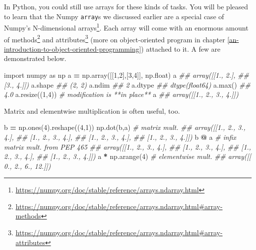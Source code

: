 \documentclass[
  12pt,
]{krantz}
\makeatletter
\newenvironment{Shaded}{\begin{snugshade}}{\end{snugshade}}
\newcommand{\BuiltInTok}[1]{#1}
\newcommand{\CommentTok}[1]{\textcolor[rgb]{0.37,0.37,0.37}{\textit{#1}}}
\newcommand{\DecValTok}[1]{\textcolor[rgb]{0.06,0.06,0.06}{#1}}
\newcommand{\ImportTok}[1]{#1}
\newcommand{\NormalTok}[1]{#1}
\newcommand{\OperatorTok}[1]{\textcolor[rgb]{0.43,0.43,0.43}{\textbf{#1}}}
\renewcommand{\href}[2]{#2\footnote{\url{#1}}}
\newenvironment{kframe}{%
\medskip{}
\setlength{\fboxsep}{.8em}
 \def\at@end@of@kframe{}%
 \ifinner\ifhmode%
  \def\at@end@of@kframe{\end{minipage}}%
  \begin{minipage}{\columnwidth}%
 \fi\fi%
 \def\FrameCommand##1{\hskip\@totalleftmargin \hskip-\fboxsep
 \colorbox{shadecolor}{##1}\hskip-\fboxsep
     \hskip-\linewidth \hskip-\@totalleftmargin \hskip\columnwidth}%
 \MakeFramed {\advance\hsize-\width
   \@totalleftmargin\z@ \linewidth\hsize
   \@setminipage}}%
 {\par\unskip\endMakeFramed%
 \at@end@of@kframe}
\renewenvironment{Shaded}{\begin{kframe}}{\end{kframe}}
\makeatother
\begin{document}
In Python, you could still use arrays for these kinds of tasks. You will be pleased to learn that the Numpy \texttt{array}s we discussed earlier are a special case of \href{https://numpy.org/doc/stable/reference/arrays.ndarray.html}{Numpy's N-dimensional arrays}. Each array will come with an enormous amount of \href{https://numpy.org/doc/stable/reference/arrays.ndarray.html\#array-methods}{methods} and \href{https://numpy.org/doc/stable/reference/arrays.ndarray.html\#array-attributes}{attributes} (more on object-oriented program in chapter \ref{an-introduction-to-object-oriented-programming}) attached to it. A few are demonstrated below.

\begin{Shaded}
\begin{Highlighting}[]
\ImportTok{import}\NormalTok{ numpy }\ImportTok{as}\NormalTok{ np}
\NormalTok{a }\OperatorTok{=}\NormalTok{ np.array([[}\DecValTok{1}\NormalTok{,}\DecValTok{2}\NormalTok{],[}\DecValTok{3}\NormalTok{,}\DecValTok{4}\NormalTok{]], np.}\BuiltInTok{float}\NormalTok{)}
\NormalTok{a}
\CommentTok{\#\# array([[1., 2.],}
\CommentTok{\#\#        [3., 4.]])}
\NormalTok{a.shape}
\CommentTok{\#\# (2, 2)}
\NormalTok{a.ndim}
\CommentTok{\#\# 2}
\NormalTok{a.dtype}
\CommentTok{\#\# dtype(\textquotesingle{}float64\textquotesingle{})}
\NormalTok{a.}\BuiltInTok{max}\NormalTok{()}
\CommentTok{\#\# 4.0}
\NormalTok{a.resize((}\DecValTok{1}\NormalTok{,}\DecValTok{4}\NormalTok{)) }\CommentTok{\# modification is **in place**}
\NormalTok{a}
\CommentTok{\#\# array([[1., 2., 3., 4.]])}
\end{Highlighting}
\end{Shaded}

Matrix and elementwise multiplication is often useful, too.

\begin{Shaded}
\begin{Highlighting}[]
\NormalTok{b }\OperatorTok{=}\NormalTok{ np.ones(}\DecValTok{4}\NormalTok{).reshape((}\DecValTok{4}\NormalTok{,}\DecValTok{1}\NormalTok{)) }
\NormalTok{np.dot(b,a) }\CommentTok{\# matrix mult.}
\CommentTok{\#\# array([[1., 2., 3., 4.],}
\CommentTok{\#\#        [1., 2., 3., 4.],}
\CommentTok{\#\#        [1., 2., 3., 4.],}
\CommentTok{\#\#        [1., 2., 3., 4.]])}
\NormalTok{b }\OperatorTok{@}\NormalTok{ a }\CommentTok{\# infix matrix mult. from PEP 465}
\CommentTok{\#\# array([[1., 2., 3., 4.],}
\CommentTok{\#\#        [1., 2., 3., 4.],}
\CommentTok{\#\#        [1., 2., 3., 4.],}
\CommentTok{\#\#        [1., 2., 3., 4.]])}
\NormalTok{a }\OperatorTok{*}\NormalTok{ np.arange(}\DecValTok{4}\NormalTok{) }\CommentTok{\# elementwise mult.}
\CommentTok{\#\# array([[ 0.,  2.,  6., 12.]])}
\end{Highlighting}
\end{Shaded}
\end{document}
